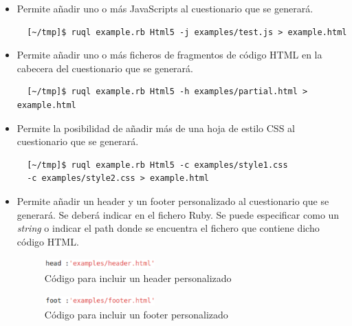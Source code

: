 \begin{itemize}
  \item Permite a\~{n}adir uno o m\'as JavaScripts al cuestionario que se generar\'a.
  \begin{verbatim}
  [~/tmp]$ ruql example.rb Html5 -j examples/test.js > example.html
  \end{verbatim}
  
  \item Permite a\~{n}adir uno o m\'as ficheros de fragmentos de c\'odigo HTML en la cabecera 
  del cuestionario que se generar\'a.
  \begin{verbatim}
  [~/tmp]$ ruql example.rb Html5 -h examples/partial.html > example.html
  \end{verbatim}
  
  \item Permite la posibilidad de a\~{n}adir m\'as de una hoja de estilo CSS al cuestionario que se generar\'a.
  \begin{verbatim}
  [~/tmp]$ ruql example.rb Html5 -c examples/style1.css 
  -c examples/style2.css > example.html
  \end{verbatim}
  
  \item Permite a\~{n}adir un header y un footer personalizado al cuestionario que se generar\'a. Se deber\'a indicar
  en el fichero Ruby. Se puede especificar como un \textit{string} o indicar el path donde se encuentra el fichero que contiene 
  dicho c\'odigo HTML.
  
  \begin{figure}[!th]
  \begin{center}
  \includegraphics[width=0.4\textwidth]{images/header.eps}
  \caption{C\'odigo para incluir un header personalizado}
  \label{fig:header}
  \end{center}
  \end{figure}
  
  \begin{figure}[!th]
  \begin{center}
  \includegraphics[width=0.4\textwidth]{images/footer.eps}
  \caption{C\'odigo para incluir un footer personalizado}
  \label{fig:footer}
  \end{center}
  \end{figure}


\end{itemize}
